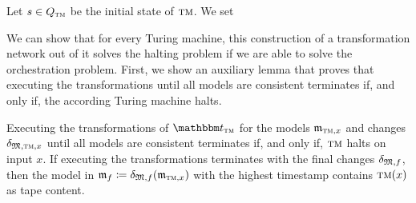 Let $s \in Q_{\textsc{tm}}$ be the initial state of $\textsc{tm}$. We set
%

We can show that for every Turing machine, this construction of a transformation network out of it solves the halting problem if we are able to solve the orchestration problem.
First, we show an auxiliary lemma that proves that executing the transformations until all models are consistent terminates if, and only if, the according Turing machine halts.

\begin{lemma}
    \label{lemma:turing_machine_construction}
    Executing the transformations of $\transformationset{T}_{\TuringMachine}$ for the models $\modeltuple{m}_{\TuringMachine,x}$ and changes $\changetuple{\metamodeltuple{M},\TuringMachine,x}$ until all models are consistent terminates if, and only if, $\textsc{tm}$ halts on input $x$.
	If executing the transformations terminates with the final changes $\changetuple{\metamodeltuple{M},f}$, then the model in $\modeltuple{m}_{f} \equalsperdefinition \changetuple{\metamodeltuple{M},f}(\modeltuple{m}_{\TuringMachine,x})$ with the highest timestamp contains $\textsc{tm}(x)$ as tape content.
\end{lemma}

